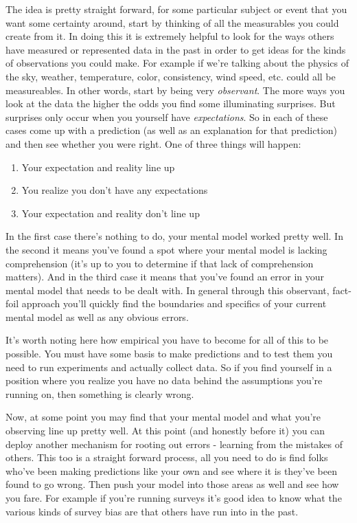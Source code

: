 \documentclass[11pt,a5paper]{book}
\begin{document}
The idea is pretty straight forward, for some particular subject or event that you want some certainty around, start by thinking of all the measurables you could create from it. In doing this it is extremely helpful to look for the ways others have measured or represented data in the past in order to get ideas for the kinds of observations you could make. For example if we're talking about the physics of the sky, weather, temperature, color, consistency, wind speed, etc. could all be measureables. In other words, start by being very \textit{observant}. The more ways you look at the data the higher the odds you find some illuminating surprises. But surprises only occur when you yourself have \textit{expectations}. So in each of these cases come up with a prediction (as well as an explanation for that prediction) and then see whether you were right. One of three things will happen:

\begin{enumerate}
\item Your expectation and reality line up
\item You realize you don't have any expectations
\item Your expectation and reality don't line up
\end{enumerate} 

In the first case there's nothing to do, your mental model worked pretty well. In the second it means you've found a spot where your mental model is lacking comprehension (it's up to you to determine if that lack of comprehension matters). And in the third case it means that you've found an error in your mental model that needs to be dealt with. In general through this observant, fact-foil \cite{lipton} approach you'll quickly find the boundaries and specifics of your current mental model as well as any obvious errors.
\newline 

It's worth noting here how empirical you have to become for all of this to be possible. You must have some basis to make predictions and to test them you need to run experiments and actually collect data. So if you find yourself in a position where you realize you have no data behind the assumptions you're running on, then something is clearly wrong.
\newline

Now, at some point you may find that your mental model and what you're observing line up pretty well. At this point (and honestly before it) you can deploy another mechanism for rooting out errors - learning from the mistakes of others. This too is a straight forward process, all you need to do is find folks who've been making predictions like your own and see where it is they've been found to go wrong. Then push your model into those areas as well and see how you fare. For example if you're running surveys it's good idea to know what the various kinds of survey bias are that others have run into in the past.  
\newline
\end{document}
